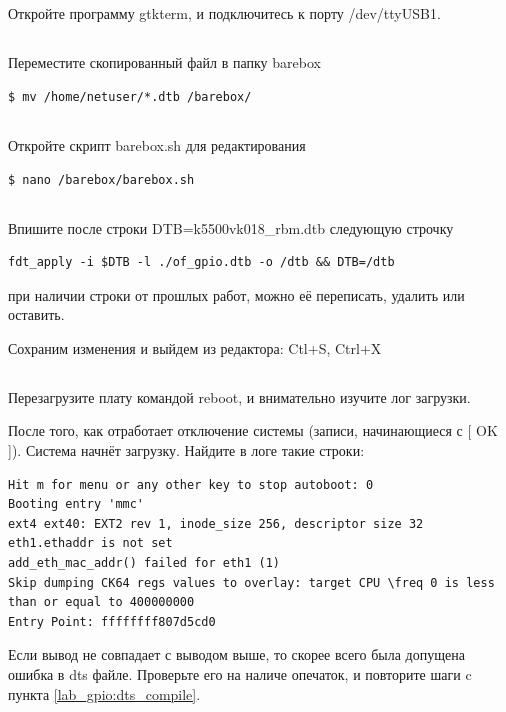 \subsection{} Откройте программу gtkterm, и подключитесь к порту /dev/ttyUSB1.

\subsection{} Переместите скопированный файл в папку barebox
\begin{lstlisting}[style=bash]
$ mv /home/netuser/*.dtb /barebox/
\end{lstlisting}

\subsection{} Откройте скрипт barebox.sh для редактирования
\begin{lstlisting}[style=bash]
$ nano /barebox/barebox.sh
\end{lstlisting}

\subsection{} Впишите после строки DTB=k5500vk018\_rbm.dtb следующую строчку 
\begin{lstlisting}[style=stdout]
fdt_apply -i $DTB -l ./of_gpio.dtb -o /dtb && DTB=/dtb
\end{lstlisting}
при наличии строки от прошлых работ, можно её переписать, удалить или оставить.

Сохраним изменения и выйдем из редактора: Ctl+S,  Ctrl+X

\subsection{} Перезагрузите плату командой reboot, и внимательно изучите лог загрузки.

После того, как отработает отключение системы (записи, начинающиеся с [ OK ]). Система начнёт загрузку. Найдите в логе такие строки:
\begin{lstlisting}[style=stdout] 
Hit m for menu or any other key to stop autoboot: 0
Booting entry 'mmc'
ext4 ext40: EXT2 rev 1, inode_size 256, descriptor size 32
eth1.ethaddr is not set
add_eth_mac_addr() failed for eth1 (1)
Skip dumping CK64 regs values to overlay: target CPU \freq 0 is less than or equal to 400000000
Entry Point: ffffffff807d5cd0
\end{lstlisting}
Если вывод не совпадает с выводом выше, то скорее всего была допущена ошибка в dts файле. Проверьте его на наличе опечаток, и повторите шаги c пункта \ref{lab_gpio:dts_compile}.


